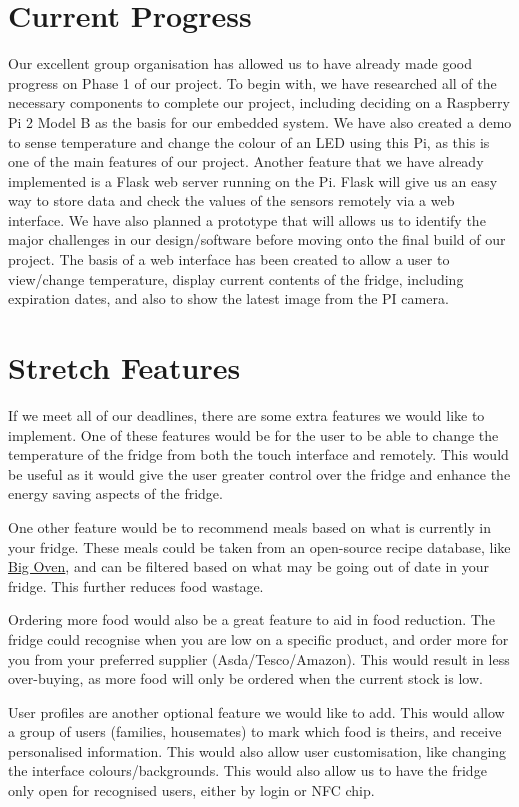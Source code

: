 \documentclass[10pt]{article}
\begin{document}
\newpage
\section{Current Progress}

Our excellent group organisation has allowed us to have already made good progress on Phase 1 of our project. To begin with, we have researched all of the necessary components to complete our project, including deciding on a Raspberry Pi 2 Model B as the basis for our embedded system. We have also created a demo to sense temperature and change the colour of an LED using this Pi, as this is one of the main features of our project. Another feature that we have already implemented is a Flask web server running on the Pi. Flask will give us an easy way to store data and check the values of the sensors remotely via a web interface. We have also planned a prototype that will allows us to identify the major challenges in our design/software before moving onto the final build of our project. The basis of a web interface has been created to allow a user to view/change temperature, display current contents of the fridge, including expiration dates, and also to show the latest image from the PI camera.

\section{Stretch Features}
If we meet all of our deadlines, there are some extra features we would like to implement. One of these features would be for the user to be able to change the temperature of the fridge from both the touch interface and remotely. This would be useful as it would give the user greater control over the fridge and enhance the energy saving aspects of the fridge.

One other feature would be to recommend meals based on what is currently in your fridge. These meals could be taken from an open-source recipe database, like \hyperref[http://api.bigoven.com]{Big Oven}, and can be filtered based on what may be going out of date in your fridge. This further reduces food wastage.

Ordering more food would also be a great feature to aid in food reduction. The fridge could recognise when you are low on a specific product, and order more for you from your preferred supplier (Asda/Tesco/Amazon). This would result in less over-buying, as more food will only be ordered when the current stock is low.

User profiles are another optional feature we would like to add. This would allow a group of users (families, housemates) to mark which food is theirs, and receive personalised information. This would also allow user customisation, like changing the interface colours/backgrounds. This would also allow us to have the fridge only open for recognised users, either by login or NFC chip.
\end{document}
